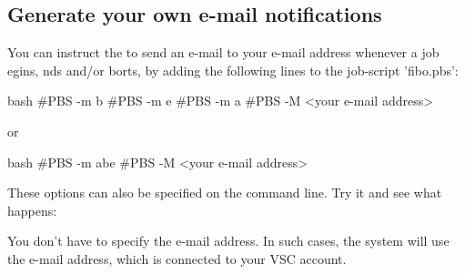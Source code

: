 \subsection{Generate your own e-mail notifications}

You can instruct the \hpc to send an e-mail to your e-mail address whenever a
job egins, nds and/or borts, by adding the
following lines to the job-script 'fibo.pbs':

\begin{code}{bash}
#PBS -m b
#PBS -m e
#PBS -m a
#PBS -M <your e-mail address>
\end{code}
or
\begin{code}{bash}
#PBS -m abe
#PBS -M <your e-mail address>
\end{code}

These options can also be specified on the command line.  Try it and see what
happens:

\begin{prompt}
\end{prompt}

You don't have to specify the e-mail address. In such cases, the system will
use the e-mail address, which is connected to your VSC account.

